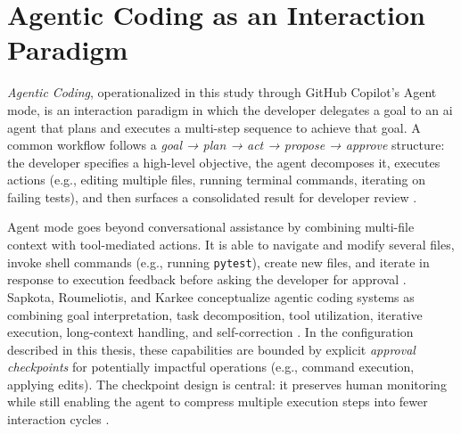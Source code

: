 \section{Agentic Coding as an Interaction Paradigm}
\label{sec:bg-agentic}

\emph{Agentic Coding}, operationalized in this study through GitHub Copilot’s Agent mode, is an interaction paradigm in which the developer delegates a goal to an \gls{ai} agent that plans and executes a multi-step sequence to achieve that goal. A common workflow follows a \emph{goal → plan → act → propose → approve} structure: the developer specifies a high-level objective, the agent decomposes it, executes actions (e.g., editing multiple files, running terminal commands, iterating on failing tests), and then surfaces a consolidated result for developer review \parencite{vscodeCopilotAgentMode, sarkar2025codewithme}.

Agent mode goes beyond conversational assistance by combining multi-file context with tool-mediated actions. It is able to navigate and modify several files, invoke shell commands (e.g., running \texttt{pytest}), create new files, and iterate in response to execution feedback before asking the developer for approval \parencite{vscodeCopilotCodingAgent}. Sapkota, Roumeliotis, and Karkee conceptualize agentic coding systems as combining goal interpretation, task decomposition, tool utilization, iterative execution, long-context handling, and self-correction \parencite{sapkota2025vibecoding}. In the configuration described in this thesis, these capabilities are bounded by explicit \emph{approval checkpoints} for potentially impactful operations (e.g., command execution, applying edits). The checkpoint design is central: it preserves human monitoring while still enabling the agent to compress multiple execution steps into fewer interaction cycles \parencite[p.~21]{sarkar2025codewithme}.

